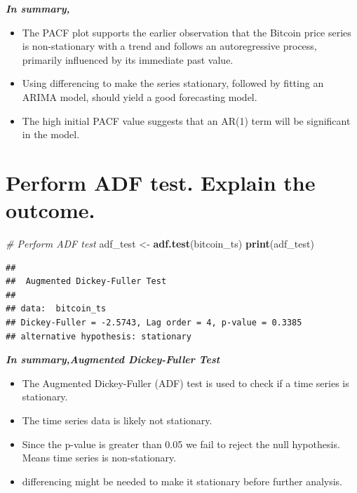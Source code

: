 \documentclass[
]{book}
\newenvironment{Shaded}{\begin{snugshade}}{\end{snugshade}}
\newcommand{\CommentTok}[1]{\textcolor[rgb]{0.56,0.35,0.01}{\textit{#1}}}
\newcommand{\FunctionTok}[1]{\textcolor[rgb]{0.13,0.29,0.53}{\textbf{#1}}}
\newcommand{\NormalTok}[1]{#1}
\newcommand{\OtherTok}[1]{\textcolor[rgb]{0.56,0.35,0.01}{#1}}
\providecommand{\tightlist}{%
  \setlength{\itemsep}{0pt}\setlength{\parskip}{0pt}}
\begin{document}
\emph{\textbf{In summary,}}

\begin{itemize}
\tightlist
\item
  The PACF plot supports the earlier observation that the Bitcoin price series is non-stationary with a trend and follows an autoregressive process, primarily influenced by its immediate past value.
\item
  Using differencing to make the series stationary, followed by fitting an ARIMA model, should yield a good forecasting model.
\item
  The high initial PACF value suggests that an AR(1) term will be significant in the model.
\end{itemize}

\section{Perform ADF test. Explain the outcome.}\label{perform-adf-test.-explain-the-outcome.}

\begin{Shaded}
\begin{Highlighting}[]
\CommentTok{\# Perform ADF test}
\NormalTok{adf\_test }\OtherTok{\textless{}{-}} \FunctionTok{adf.test}\NormalTok{(bitcoin\_ts)}
\FunctionTok{print}\NormalTok{(adf\_test)}
\end{Highlighting}
\end{Shaded}

\begin{verbatim}
## 
##  Augmented Dickey-Fuller Test
## 
## data:  bitcoin_ts
## Dickey-Fuller = -2.5743, Lag order = 4, p-value = 0.3385
## alternative hypothesis: stationary
\end{verbatim}

\emph{\textbf{In summary,Augmented Dickey-Fuller Test}}

\begin{itemize}
\item
  The Augmented Dickey-Fuller (ADF) test is used to check if a time series is stationary.
\item
  The time series data is likely not stationary.
\item
  Since the p-value is greater than 0.05 we fail to reject the null hypothesis. Means time series is non-stationary.
\item
  differencing might be needed to make it stationary before further analysis.
\end{itemize}
\end{document}
